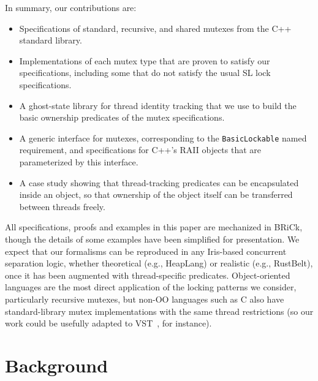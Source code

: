 \documentclass[acmsmall,screen,review,anonymous]{acmart}
\begin{document}
In summary, our contributions are:
\begin{itemize}
\item Specifications of standard, recursive, and shared mutexes from the C++ standard library.
\item Implementations of each mutex type that are proven to satisfy our specifications, including some that do not satisfy the usual SL lock specifications.
\item A ghost-state library for thread identity tracking that we use to build the basic ownership predicates of the mutex specifications.
\item A generic interface for mutexes, corresponding to the \lstinline{BasicLockable} named requirement, and specifications for C++'s RAII objects that are parameterized by this interface.
\item A case study showing that thread-tracking predicates can be encapsulated inside an object, so that ownership of the object itself can be transferred between threads freely.
\end{itemize}

All specifications, proofs and examples in this paper are mechanized in BRiCk, though the details of some examples have been simplified for presentation. We expect that our formalisms can be reproduced in any Iris-based concurrent separation logic, whether theoretical (e.g., HeapLang) or realistic (e.g., RustBelt), once it has been augmented with thread-specific predicates. Object-oriented languages are the most direct application of the locking patterns we consider, particularly recursive mutexes, but non-OO languages such as C also have standard-library mutex implementations with the same thread restrictions (so our work could be usefully adapted to VST~\cite{vst}, for instance).

\section{Background}
\end{document}
